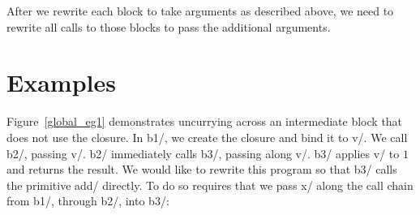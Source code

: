 After we rewrite each block to take arguments as described above, we need to
rewrite all calls to those blocks to pass the additional arguments. 

\section*{Examples}

Figure~\ref{global_eg1} demonstrates uncurrying across an intermediate
block that does not use the closure. In \lab b1/, we create the
closure \clo[k1:x] and bind it to \var v/. We call \lab b2/, passing
\var v/. \lab b2/ immediately calls \lab b3/, passing along \var
v/. \lab b3/ applies \var v/ to $1$ and returns the result. We would
like to rewrite this program so that \lab b3/ calls the primitive
\primlab add/ directly. To do so requires that we pass \var x/ along
the call chain from \lab b1/, through \lab b2/, into \lab b3/:



